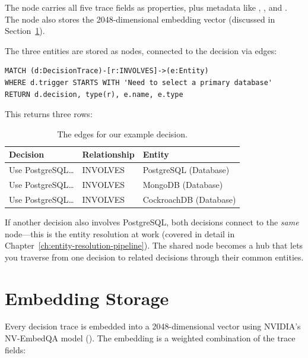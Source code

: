 The  node carries all five trace fields as properties, plus
metadata like , , and .  The node
also stores the 2048-dimensional embedding vector (discussed in
Section~\ref{sec:embedding-storage}).

The three entities are stored as  nodes, connected to the decision
via  edges:

\begin{lstlisting}[style=cypher, numbers=none, caption={Viewing the decision and its entity relationships.}]
MATCH (d:DecisionTrace)-[r:INVOLVES]->(e:Entity)
WHERE d.trigger STARTS WITH 'Need to select a primary database'
RETURN d.decision, type(r), e.name, e.type
\end{lstlisting}

This returns three rows:

\begin{table}[ht]
\centering
\caption{The  edges for our example decision.}
\label{tab:involves-edges}
\begin{tabular}{l l l}
\toprule
\textbf{Decision} & \textbf{Relationship} & \textbf{Entity} \\
\midrule
Use PostgreSQL\ldots & INVOLVES & PostgreSQL (Database) \\
Use PostgreSQL\ldots & INVOLVES & MongoDB (Database) \\
Use PostgreSQL\ldots & INVOLVES & CockroachDB (Database) \\
\bottomrule
\end{tabular}
\end{table}

If another decision also involves PostgreSQL, both decisions connect to the
\emph{same}  node---this is the entity resolution at work (covered in
detail in Chapter~\ref{ch:entity-resolution-pipeline}).  The shared node becomes
a hub that lets you traverse from one decision to related decisions through their
common entities.


\section{Embedding Storage}
\label{sec:embedding-storage}

Every decision trace is embedded into a 2048-dimensional vector using NVIDIA's
NV-EmbedQA model ().  The embedding is a
weighted combination of the trace fields:

